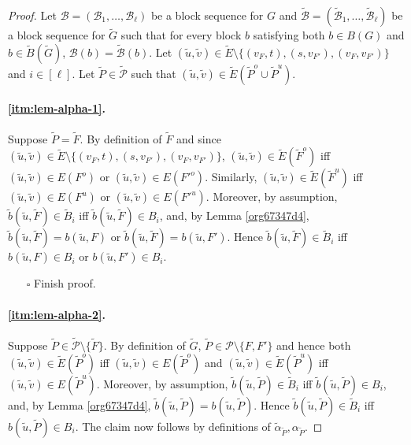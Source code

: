 \documentclass[fontsize=11pt,paper=a4]{book}
\begin{document}
\begin{proof}
Let \(\mathcal{B}=(\mathscr{B}_1,\dots,\mathscr{B}_{\ell})\) be a block sequence for \(G\) and \(\tilde{\mathcal{B}}=(\tilde{\mathscr{B}}_1,\dots,\tilde{\mathscr{B}}_{\ell})\) be a block sequence for \(\tilde{G}\) such that for every block \(b\) satisfying both \(b\in B(G)\) and \(b\in\tilde{B}(\tilde{G})\), \(\mathcal{B}(b)=\tilde{\mathcal{B}}(b)\).
Let \((\tilde{u},\tilde{v})\in\tilde{E}\setminus\{(v_F,t),(s,v_{F'}),(v_F,v_{F'})\}\) and \(i\in[\ell]\).
Let \(\tilde{P}\in\tilde{\mathcal{P}}\) such that \((\tilde{u},\tilde{v})\in\tilde{E}(\tilde{P}^o\cup\tilde{P}^u)\).

\paragraph{\ref{itm:lem-alpha-1}.}
Suppose \(\tilde{P}=\tilde{F}\).
By definition of \(\tilde{F}\) and since \((\tilde{u},\tilde{v})\in\tilde{E}\setminus\{(v_F,t),(s,v_{F'}),(v_F,v_{F'})\}\), \((\tilde{u},\tilde{v})\in\tilde{E}(\tilde{F}^o)\) iff \((\tilde{u},\tilde{v})\in E(F^o)\) or \((\tilde{u},\tilde{v})\in E(F'^o)\).
Similarly, \((\tilde{u},\tilde{v})\in\tilde{E}(\tilde{F}^u)\) iff \((\tilde{u},\tilde{v})\in E(F^u)\) or \((\tilde{u},\tilde{v})\in E(F'^u)\).
Moreover, by assumption, \(\tilde{b}(\tilde{u},\tilde{F})\in\tilde{B}_i\) iff \(\tilde{b}(\tilde{u},\tilde{F})\in B_i\), and, by Lemma \ref{org67347d4}, \(\tilde{b}(\tilde{u},\tilde{F})=b(\tilde{u},F)\) or \(\tilde{b}(\tilde{u},\tilde{F})=b(\tilde{u},F')\).
Hence \(\tilde{b}(\tilde{u},\tilde{F})\in\tilde{B}_i\) iff \(b(\tilde{u},F)\in B_i\) or \(b(\tilde{u},F')\in B_i\).

\begin{itemize}
\item[{$\square$}] Finish proof.
\end{itemize}

\paragraph{\ref{itm:lem-alpha-2}.}
Suppose \(\tilde{P}\in\tilde{\mathcal{P}}\setminus\{\tilde{F}\}\).
By definition of \(\tilde{G}\), \(\tilde{P}\in\mathcal{P}\setminus\{F,F'\}\) and hence both \((\tilde{u},\tilde{v})\in\tilde{E}(\tilde{P}^o)\) iff \((\tilde{u},\tilde{v})\in E(\tilde{P}^o)\) and \((\tilde{u},\tilde{v})\in\tilde{E}(\tilde{P}^u)\) iff \((\tilde{u},\tilde{v})\in E(\tilde{P}^u)\).
Moreover, by assumption, \(\tilde{b}(\tilde{u},\tilde{P})\in\tilde{B}_i\) iff \(\tilde{b}(\tilde{u},\tilde{P})\in B_i\), and, by Lemma \ref{org67347d4}, \(\tilde{b}(\tilde{u},\tilde{P})=b(\tilde{u},\tilde{P})\).
Hence \(\tilde{b}(\tilde{u},\tilde{P})\in\tilde{B}_i\) iff \(b(\tilde{u},\tilde{P})\in B_i\).
The claim now follows by definitions of \(\tilde{\alpha}_{\tilde{P}},\alpha_{\tilde{P}}\).
\end{proof}
\end{document}
